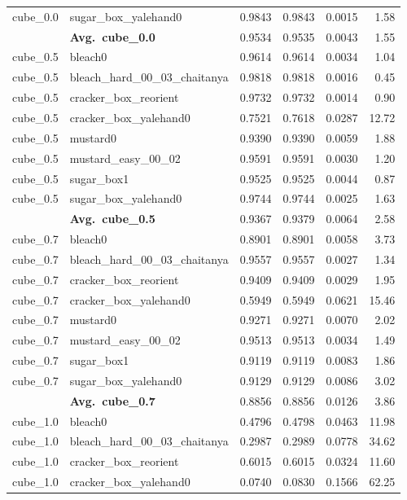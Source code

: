 \begin{longtable}{llrrrr}
  cube_0.0 & sugar\_box\_yalehand0 & 0.9843 & 0.9843 & 0.0015 & 1.58 \\
  \cmidrule{2-6}
  & \textbf{Avg.~cube_0.0} & 0.9534 & 0.9535 & 0.0043 & 1.55 \\
  \midrule
  cube_0.5 & bleach0 & 0.9614 & 0.9614 & 0.0034 & 1.04 \\
  cube_0.5 & bleach\_hard\_00\_03\_chaitanya & 0.9818 & 0.9818 & 0.0016 & 0.45 \\
  cube_0.5 & cracker\_box\_reorient & 0.9732 & 0.9732 & 0.0014 & 0.90 \\
  cube_0.5 & cracker\_box\_yalehand0 & 0.7521 & 0.7618 & 0.0287 & 12.72 \\
  cube_0.5 & mustard0 & 0.9390 & 0.9390 & 0.0059 & 1.88 \\
  cube_0.5 & mustard\_easy\_00\_02 & 0.9591 & 0.9591 & 0.0030 & 1.20 \\
  cube_0.5 & sugar\_box1 & 0.9525 & 0.9525 & 0.0044 & 0.87 \\
  cube_0.5 & sugar\_box\_yalehand0 & 0.9744 & 0.9744 & 0.0025 & 1.63 \\
  \cmidrule{2-6}
  & \textbf{Avg.~cube_0.5} & 0.9367 & 0.9379 & 0.0064 & 2.58 \\
  \midrule
  cube_0.7 & bleach0 & 0.8901 & 0.8901 & 0.0058 & 3.73 \\
  cube_0.7 & bleach\_hard\_00\_03\_chaitanya & 0.9557 & 0.9557 & 0.0027 & 1.34 \\
  cube_0.7 & cracker\_box\_reorient & 0.9409 & 0.9409 & 0.0029 & 1.95 \\
  cube_0.7 & cracker\_box\_yalehand0 & 0.5949 & 0.5949 & 0.0621 & 15.46 \\
  cube_0.7 & mustard0 & 0.9271 & 0.9271 & 0.0070 & 2.02 \\
  cube_0.7 & mustard\_easy\_00\_02 & 0.9513 & 0.9513 & 0.0034 & 1.49 \\
  cube_0.7 & sugar\_box1 & 0.9119 & 0.9119 & 0.0083 & 1.86 \\
  cube_0.7 & sugar\_box\_yalehand0 & 0.9129 & 0.9129 & 0.0086 & 3.02 \\
  \cmidrule{2-6}
  & \textbf{Avg.~cube_0.7} & 0.8856 & 0.8856 & 0.0126 & 3.86 \\
  \midrule
  cube_1.0 & bleach0 & 0.4796 & 0.4798 & 0.0463 & 11.98 \\
  cube_1.0 & bleach\_hard\_00\_03\_chaitanya & 0.2987 & 0.2989 & 0.0778 & 34.62 \\
  cube_1.0 & cracker\_box\_reorient & 0.6015 & 0.6015 & 0.0324 & 11.60 \\
  cube_1.0 & cracker\_box\_yalehand0 & 0.0740 & 0.0830 & 0.1566 & 62.25 \\

\end{longtable}
